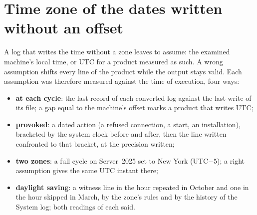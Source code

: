 \documentclass[11pt,a4paper,oneside]{report}
\begin{document}
\section{Time zone of the dates written without an offset}

A log that writes the time without a zone leaves \wac{} to assume: the
examined machine's local time, or UTC for a product measured as such. A
wrong assumption shifts every line of the product while the output stays
valid. Each assumption was therefore measured against the time of
execution, four ways:
\begin{itemize}
  \item \textbf{at each cycle}: the last record of each converted log
    against the last write of its file; a gap equal to the machine's offset
    marks a product that writes UTC;
  \item \textbf{provoked}: a dated action (a refused connection, a start, an
    installation), bracketed by the system clock before and after, then the
    line written confronted to that bracket, at the precision written;
  \item \textbf{two zones}: a full cycle on Server~2025 set to New York
    (UTC$-5$); a right assumption gives the same UTC instant there;
  \item \textbf{daylight saving}: a witness line in the hour repeated in
    October and one in the hour skipped in March, by the zone's rules and by
    the history of the System log; both readings of each said.
\end{itemize}
\end{document}
